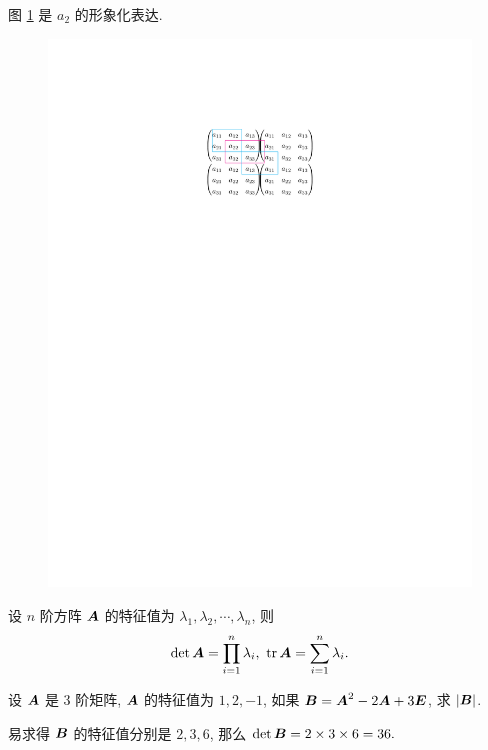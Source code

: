 图 \ref{fig:kjiezzshi} 是 $a_2$ 的形象化表达.
\begin{figure}[H]
    \centering
    \includegraphics[scale=1]{figures/kjiezzshi.pdf}
    \caption{}
    \label{fig:kjiezzshi}
\end{figure}

\begin{theorem}[特征值的积与和]
    设 $n$ 阶方阵 $\vb*{A}$ 的特征值为 $\lambda_1,\lambda_2,\cdots,\lambda_n$, 则 $$\displaystyle\det\vb*{A}=\prod_{i=1}^{n}\lambda_i,~\tr\vb*{A}=\sum_{i=1}^{n}\lambda_i.$$
\end{theorem}

\begin{example}
    设 $\vb*{A}$ 是 3 阶矩阵, $\vb*{A}$ 的特征值为 $1,2,-1$, 如果 $\vb*{B}=\vb*{A}^2-2\vb*{A}+3\vb*{E}$, 求 $|\vb*{B}|$.
\end{example}
\begin{solution}
    易求得 $\vb*{B}$ 的特征值分别是 $2,3,6$, 那么 $\det\vb*{B}=2\times3\times6=36.$
\end{solution}

